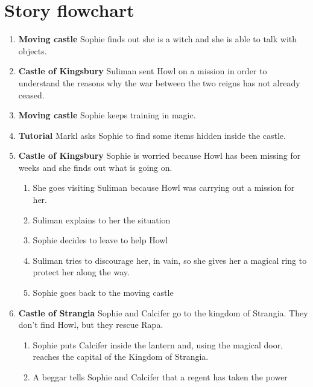 \section{Story flowchart}

\begin{enumerate}
	\item \textbf{Moving castle} Sophie finds out she is a witch and she is able to talk with objects.
	
	\item \textbf{Castle of Kingsbury} Suliman sent Howl on a mission in order to understand the reasons why the war between the two reigns has not already ceased.
	
	\item \textbf{Moving castle} Sophie keeps training in magic.
	
	\item \textbf{Tutorial} Markl asks Sophie to find some items hidden inside the castle.
	
	\item \textbf{Castle of Kingsbury} Sophie is worried because Howl has been missing for weeks and she finds out what is going on.
	\begin{enumerate}
		\item She goes visiting Suliman because Howl was carrying out a mission for her.
		
		\item Suliman explains to her the situation

		\item Sophie decides to leave to help Howl

		\item Suliman tries to discourage her, in vain, so she gives her a magical ring to protect her along the way.

		\item Sophie goes back to the moving castle
	\end{enumerate}

	\item \textbf{Castle of Strangia} Sophie and Calcifer go to the kingdom of Strangia. They don’t find Howl, but they rescue Rapa.

	\begin{enumerate}
		\item Sophie puts Calcifer inside the lantern and, using the magical door, reaches  the capital of the Kingdom of Strangia.
	
		\item A beggar tells Sophie and Calcifer that a regent has taken the power
	

\end{enumerate}
\end{enumerate}
